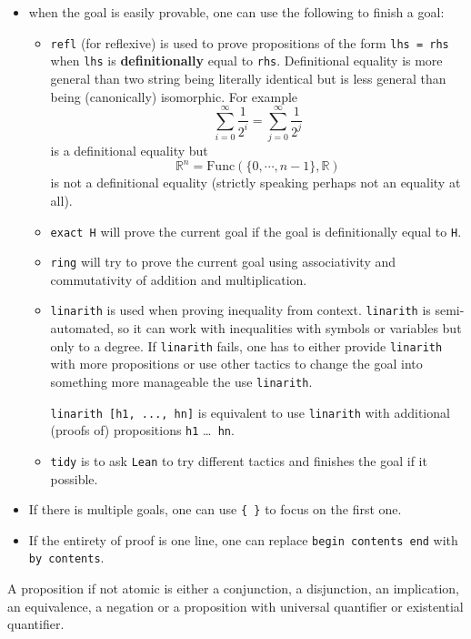 \documentclass{report}
\theoremstyle{definition}
\begin{document}
\begin{itemize}
  \item when the goal is easily provable, one can use the following to finish a goal:
  \begin{itemize}
    \item {\tt \small refl} (for reflexive) is used to prove propositions of the form {\tt \small lhs = rhs} when {\tt \small lhs} is {\bf definitionally} equal to {\tt \small rhs}. Definitional equality is more general than two string being literally identical but is less general than being (canonically) isomorphic. For example
    $$
  \sum_{i=0}^\infty \frac{1}{2^i}=\sum_{j=0}^\infty \frac{1}{2^j}
    $$
    is a definitional equality but
    $$
  \mathbb R^n = \mathrm{Func}\left(\{0,\cdots, n-1\},\mathbb R\right)
    $$ is not a definitional equality (strictly speaking perhaps not an equality at all).
    \item {\tt \small exact H} will prove the current goal if the goal is definitionally equal to {\tt \small H}. 
  
    \item {\tt \small ring} will try to prove the current goal using associativity and commutativity of addition and multiplication.
    \item {\tt \small linarith} is used when proving inequality from context. {\tt \small linarith} is semi-automated, so it can work with inequalities with symbols or variables but only to a degree. If {\tt \small linarith} fails, one has to either provide {\tt \small linarith} with more propositions or use other tactics to change the goal into something more manageable the use {\tt \small linarith}.
  
    {\tt \small linarith [h1, ..., hn]} is equivalent to use {\tt \small linarith} with additional (proofs of) propositions {\tt \small h1} \dots {\tt \small { hn}}.
    \item {\tt \small tidy} is to ask {\tt \small Lean} to try different tactics and finishes the goal if it possible.
  \end{itemize}

  \item If there is multiple goals, one can use {\tt \small \{ \}} to focus on the first one.
  \item If the entirety of proof is one line, one can replace {\tt \small begin contents end} with {\tt \small by contents}.
\end{itemize}


A proposition if not atomic is either a conjunction, a disjunction, an implication, an equivalence, a negation or a proposition with universal quantifier or existential quantifier.
\end{document}
